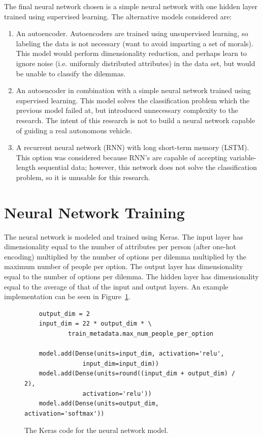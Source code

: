 \documentclass{report}
\begin{document}
The final neural network chosen is a simple neural network with one hidden layer trained using
supervised learning. The alternative models considered are:
\begin{enumerate}
    \item An autoencoder. Autoencoders are trained using unsupervised learning, so labeling the data
    is not necessary (want to avoid imparting a set of morals). This model would perform
    dimensionality reduction, and perhaps learn to ignore noise (i.e. uniformly distributed
    attributes) in the data set, but would be unable to classify the dilemmas.
    
    \item An autoencoder in combination with a simple neural network trained using supervised
    learning. This model solves the classification problem which the previous model failed at, but
    introduced unnecessary complexity to the research. The intent of this research is not to build a
    neural network capable of guiding a real autonomous vehicle.
    
    \item A recurrent neural network (RNN) with long short-term memory (LSTM). This option was
    considered because RNN's are capable of accepting variable-length sequential data; however, this
    network does not solve the classification problem, so it is unusable for this research.
\end{enumerate}

\section{Neural Network Training}

The neural network is modeled and trained using Keras. The input layer has dimensionality equal to
the number of attributes per person (after one-hot encoding) multiplied by the number of options per
dilemma multiplied by the maximum number of people per option. The output layer has dimensionality
equal to the number of options per dilemma. The hidden layer has dimensionality equal to the average
of that of the input and output layers. An example implementation can be seen in
Figure~\ref{fig:code_for_keras_model}.

\begin{figure}
    \centering
    \begin{verbatim}
    output_dim = 2
    input_dim = 22 * output_dim * \
            train_metadata.max_num_people_per_option

    model.add(Dense(units=input_dim, activation='relu',
                input_dim=input_dim))
    model.add(Dense(units=round((input_dim + output_dim) / 2),
                activation='relu'))
    model.add(Dense(units=output_dim, activation='softmax'))
    \end{verbatim}
    \caption{The Keras code for the neural network model.}
    \label{fig:code_for_keras_model}
\end{figure}
\end{document}
